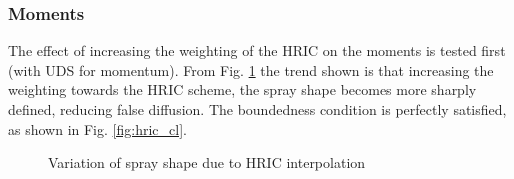 \documentclass[a4paper,10pt]{article}
\begin{document}
\subsubsection{Moments}
The effect of increasing the weighting of the HRIC on the moments is tested first (with UDS for momentum). From Fig. \ref{fig:hric} the trend shown is that increasing the weighting towards the HRIC scheme, the spray shape becomes more sharply defined, reducing false diffusion. The boundedness condition is perfectly satisfied, as shown in Fig. \ref{fig:hric_cl}.
\begin{figure}[H]
\centering
{}
\caption{Variation of spray shape due to HRIC interpolation}
\label{fig:hric}
\end{figure}
%
\end{document}
